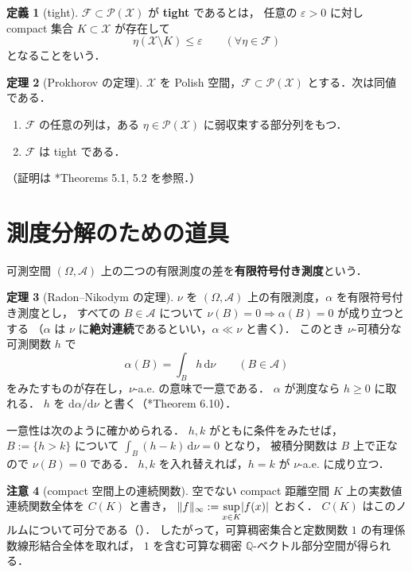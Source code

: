 \documentclass[12pt,a4j,twoside]{jreport}
\numberwithin{equation}{chapter}
\theoremstyle{definition} %
\newtheorem{thm}{定理}[chapter]
\newtheorem{dfn}[thm]{定義}
\newtheorem{rem}[thm]{注意}
\renewcommand{\sup}{\mathop{\rm sup}\limits} %
\newcommand{\X}{\mathcal{X}}
\newcommand{\Prob}{\mathcal{P}}
\newcommand{\abs}[1]{\lvert #1\rvert}
\renewcommand{\d}{\mathrm{d}} %
\begin{document}
\begin{dfn}[tight]\label{dfn:tight}
  $\mathcal{F}\subset\Prob(\X)$ が \textbf{tight} であるとは，
  任意の $\varepsilon>0$ に対し compact 集合 $K\subset\X$ が存在して
  \[
    \eta(\X\setminus K)\leq\varepsilon\qquad(\forall\eta\in\mathcal{F})
  \]
  となることをいう．
\end{dfn}

\begin{thm}[Prokhorov の定理]\label{thm:prokhorov}
  $\X$ を Polish 空間，$\mathcal{F}\subset\Prob(\X)$ とする．次は同値である．
  \begin{enumerate}
    \item $\mathcal{F}$ の任意の列は，ある $\eta\in\Prob(\X)$ に弱収束する部分列をもつ．
    \item $\mathcal{F}$ は tight である．
  \end{enumerate}
  （証明は \cite{Billingsley}*{Theorems 5.1, 5.2} を参照．）
\end{thm}

\section{測度分解のための道具}

可測空間 $(\Omega,\mathcal{A})$ 上の二つの有限測度の差を\textbf{有限符号付き測度}という．

\begin{thm}[Radon--Nikodym の定理]\label{thm:radon-nikodym}
  $\nu$ を $(\Omega,\mathcal{A})$ 上の有限測度，$\alpha$ を有限符号付き測度とし，
  すべての $B\in\mathcal{A}$ について $\nu(B)=0\Rightarrow\alpha(B)=0$ が成り立つとする
  （$\alpha$ は $\nu$ に\textbf{絶対連続}であるといい，$\alpha\ll\nu$ と書く）．
  このとき $\nu$-可積分な可測関数 $h$ で
  \[
    \alpha(B)=\int_Bh\,\d\nu\qquad(B\in\mathcal{A})
  \]
  をみたすものが存在し，$\nu$-a.e. の意味で一意である．
  $\alpha$ が測度なら $h\geq0$ に取れる．
  $h$ を $\d\alpha/\d\nu$ と書く（\cite{Rudin}*{Theorem 6.10}）．
\end{thm}

一意性は次のように確かめられる．
$h,k$ がともに条件をみたせば，$B:=\{h>k\}$ について $\int_B(h-k)\,\d\nu=0$ となり，
被積分関数は $B$ 上で正なので $\nu(B)=0$ である．
$h,k$ を入れ替えれば，$h=k$ が $\nu$-a.e. に成り立つ．

\begin{rem}[compact 空間上の連続関数]\label{rem:compact-continuous}
  空でない compact 距離空間 $K$ 上の実数値連続関数全体を $C(K)$ と書き，
  $\lVert f\rVert_\infty:=\sup_{x\in K}\abs{f(x)}$ とおく．
  $C(K)$ はこのノルムについて可分である（\cite{Dudley}）．
  したがって，可算稠密集合と定数関数 $1$ の有理係数線形結合全体を取れば，
  $1$ を含む可算な稠密 $\mathbb{Q}$-ベクトル部分空間が得られる．
\end{rem}
\end{document}
